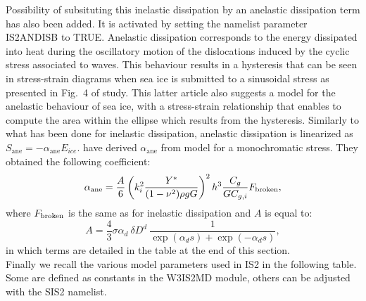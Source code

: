 Possibility of subsituting this inelastic dissipation by an anelastic dissipation term has also been added. It is activated by setting the namelist parameter {\code IS2ANDISB} to {\code TRUE}. 
Anelastic dissipation corresponds to the energy dissipated into heat during the oscillatory motion of the dislocations induced by the cyclic stress associated to waves.  This behaviour results in a hysteresis that can be seen in stress-strain diagrams when sea ice is submitted to a sinusoidal stress as presented in Fig.~4 of \cite{art:Cea98} study. This latter article also suggests a model for the anelastic behaviour of sea ice, with a stress-strain relationship that enables to compute the area within the ellipse which results from the hysteresis. Similarly to what has been done for inelastic dissipation, anelastic dissipation is linearized as  $S_{\mathrm{ane}}=-\alpha_{\mathrm{ane}} E_{ice}$. 
\cite{art:Bea18} have derived  $\alpha_{\mathrm{ane}}$  from \cite{art:Cea98} model for a monochromatic stress. They obtained the following coefficient: 
\begin{equation}
\alpha_{\mathrm{ane}}= \dfrac{A}{6}\left(k_i^{2}\dfrac{Y^*}{(1-\nu^{2})\rho gG}\right)^{2}h^{3}\frac{C_g}{GC_{g,i}} F_{\rm broken},
\label{eq:alpha_ane}
\end{equation}  
where  $F_{\rm broken}$ is the same as for inelastic dissipation and $A$ is equal to:
\begin{equation}
A=\dfrac{4}{3}\sigma \alpha_{d}~\delta D^{d}~\dfrac{1}{\exp(\alpha_{d}s)+\exp(-\alpha_{d}s)}, 
\label{eq:A_ane}
\end{equation}  
in which terms are detailed in the table at the end of this section.\\

Finally we recall the various model parameters used in IS2 in the following table. Some are defined 
as constants in the {\code W3IS2MD} module, others can be adjusted with the {\F SIS2} namelist. 

